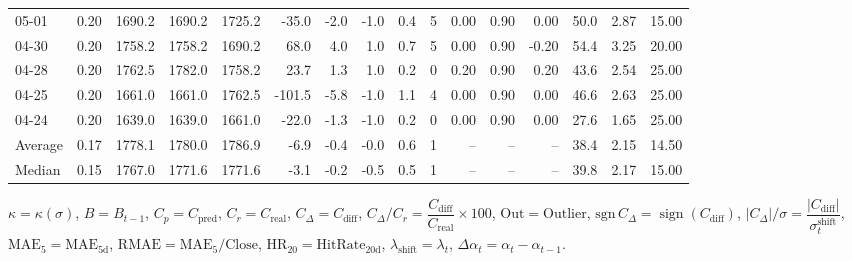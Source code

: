 \begin{threeparttable}
{\begin{tabular}{lrrrrrrrrrrrrrrr}
  05-01 &     0.20 & 1690.2 & 1690.2 & 1725.2 &      -35.0 &           -2.0 &                     -1.0 &                 0.4 &              5 &       0.00 &      0.90 &           0.00 &             50.0 &            2.87 &                  15.00 \\
  04-30 &     0.20 & 1758.2 & 1758.2 & 1690.2 &       68.0 &            4.0 &                      1.0 &                 0.7 &              5 &       0.00 &      0.90 &          -0.20 &             54.4 &            3.25 &                  20.00 \\
  04-28 &     0.20 & 1762.5 & 1782.0 & 1758.2 &       23.7 &            1.3 &                      1.0 &                 0.2 &              0 &       0.20 &      0.90 &           0.20 &             43.6 &            2.54 &                  25.00 \\
  04-25 &     0.20 & 1661.0 & 1661.0 & 1762.5 &     -101.5 &           -5.8 &                     -1.0 &                 1.1 &              4 &       0.00 &      0.90 &           0.00 &             46.6 &            2.63 &                  25.00 \\
  04-24 &     0.20 & 1639.0 & 1639.0 & 1661.0 &      -22.0 &           -1.3 &                     -1.0 &                 0.2 &              0 &       0.00 &      0.90 &           0.00 &             27.6 &            1.65 &                  25.00 \\
Average &     0.17 & 1778.1 & 1780.0 & 1786.9 &       -6.9 &           -0.4 &                     -0.0 &                 0.6 &              1 &         -- &        -- &             -- &             38.4 &            2.15 &                  14.50 \\
 Median &     0.15 & 1767.0 & 1771.6 & 1771.6 &       -3.1 &           -0.2 &                     -0.5 &                 0.5 &              1 &         -- &        -- &             -- &             39.8 &            2.17 &                  15.00 \\
\bottomrule
\end{tabular}
}
\begin{tablenotes}\footnotesize
\item $\kappa=\kappa(\sigma)$, $B=B_{t-1}$, $C_p=C_{\text{pred}}$, $C_r=C_{\text{real}}$, $C_\Delta=C_{\text{diff}}$, $C_\Delta/C_r=\dfrac{C_{\text{diff}}}{C_{\text{real}}}\times100$, $\mathrm{Out}=\text{Outlier}$, $\mathrm{sgn}\,C_\Delta=\operatorname{sign}(C_{\text{diff}})$, $|C_\Delta|/\sigma=\dfrac{|C_{\text{diff}}|}{\sigma_t^{\text{shift}}}$, $\mathrm{MAE}_5=\mathrm{MAE}_{5\text{d}}$, $\mathrm{RMAE}= \mathrm{MAE}_5 / \text{Close}$, $\mathrm{HR}_{20}=\mathrm{HitRate}_{20\text{d}}$, 
$\lambda_{\text{shift}}=\lambda_t$, 
$\Delta\alpha_t=\alpha_t-\alpha_{t-1}$.
\end{tablenotes}
\end{threeparttable}
\endgroup

